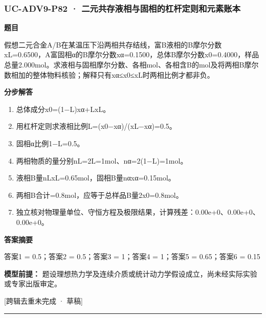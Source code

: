 \documentclass[UTF8,11pt,a4paper]{ctexart}
\begin{document}
\subsubsection*{UC-ADV9-P82 · 二元共存液相与固相的杠杆定则和元素账本}
\noindent\textbf{题目}\par
假想二元合金A/B在某温压下沿两相共存结线，富B液相的B摩尔分数xL=0.6500，A富固相α的B摩尔分数xα=0.1500，总体B摩尔分数x0=0.4000，样品总量2.000mol。求液相与固相摩尔分数、各相mol、各相含B的mol及将两相B摩尔数相加的整体物料核验；解释只有xα≤x0≤xL时两相比例才都非负。\par
\medskip\noindent\textbf{分步解答}
\begin{enumerate}
\item 总体成分x0=(1−L)xα+LxL。
\item 用杠杆定则求液相比例L=(x0−xα)/(xL−xα)=0.5。
\item 固相α比例1−L=0.5。
\item 两相物质的量分别nL=2L=1mol、nα=2(1−L)=1mol。
\item 液相B量nLxL=0.65mol，固相B量nαxα=0.15mol。
\item 两相B合计=0.8mol，应等于总样品B量2x0=0.8mol。
\item 独立核对物理量单位、守恒方程及极限结果，计算残差：0.00e+0、0.00e+0、0.00e+0。
\end{enumerate}
\noindent\textbf{答案摘要}\par
答案1 = 0.5；答案2 = 0.5；答案3 = 1；答案4 = 1；答案5 = 0.65；答案6 = 0.15\par
\noindent\textbf{模型前提：}
题设理想热力学及连续介质或统计动力学假设成立，尚未经实际实验或专家出版审定。\par
\noindent\textcolor{red!65!black}{[跨辑去重未完成 · 草稿]} \par
\medskip\hrule\medskip
{}
\end{document}
